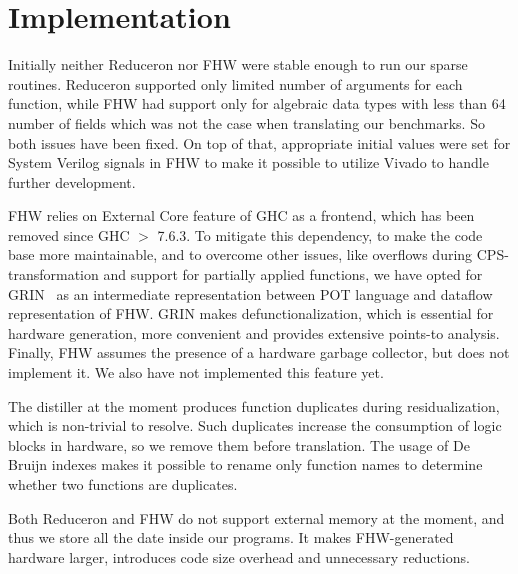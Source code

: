 \section{Implementation}

Initially neither Reduceron nor FHW were stable enough to run our sparse routines. 
Reduceron supported only limited number of arguments for each function, while FHW had support only for algebraic data types with less than 64 number of fields which was not the case when translating our benchmarks. 
So both issues have been fixed.
On top of that, appropriate initial values were set for System Verilog signals in FHW to make it possible to utilize Vivado to handle further development.

FHW relies on External Core feature of GHC as a frontend, which has been removed since GHC $>$ 7.6.3. 
To mitigate this dependency, to make the code base more maintainable, and to overcome other issues, like overflows during CPS-transformation and support for partially applied functions, we have opted for GRIN~\cite{GRIN} as an intermediate representation between POT language and dataflow representation of FHW.
GRIN makes defunctionalization, which is essential for hardware generation, more convenient and provides extensive points-to analysis. Finally, FHW assumes the presence of a hardware garbage collector, but does not implement it. We also have not implemented this feature yet.

The distiller at the moment produces function duplicates during residualization, which is non-trivial to resolve. 
Such duplicates increase the consumption of logic blocks in hardware, so we remove them before translation. The usage of De Bruijn indexes makes it possible to rename only function names to determine whether two functions are duplicates.

Both Reduceron and FHW do not support external memory at the moment, and thus we store all the date inside our programs. It makes FHW-generated hardware larger, introduces code size overhead and unnecessary reductions.